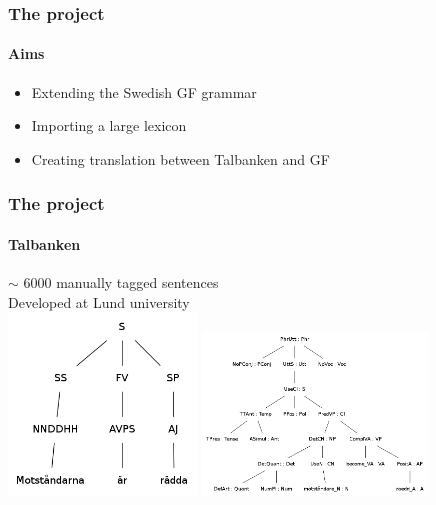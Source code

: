 \documentclass[10pt]{beamer}
\begin{document}
\begin{frame}
\frametitle{The project}
\framesubtitle{Aims} 
\begin{itemize}
\item Extending the Swedish GF grammar
\item Importing a large lexicon
\item Creating translation between Talbanken and GF
\end{itemize}
\end{frame}

\begin{frame}
\frametitle{The project}
\framesubtitle{Talbanken} 
{$\sim$ 6000 manually tagged sentences}\\
Developed at Lund university\\
\pause
\includegraphics[width=50mm]{motstaandTb.png}
\pause
\includegraphics[width=60mm]{motstand.png}

\end{frame}
\end{document}
